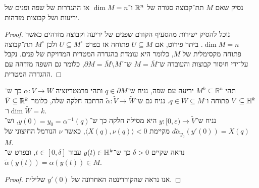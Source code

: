 \subquestion{}
נסיק שאם $M$ תת־קבוצה סגורה של $\mathbb{R}^n$ ו־$\dim M = n$ אז ההגדרות של שפה ופנים של יריעות ושל קבוצות מזדהות.
\begin{proof}
	נוכל להסיק ישירות מהסעיף הקודם שפנים של יריעה וקבוצה מזדהים כאשר $\dim M = n$.
	ביתר פירוט, אם $U \subseteq M$ פתוחה אז בפרט $U \subseteq M^\circ$ ולכן $M^\circ$ תת־קבוצה פתוחה מקסימלית של $M$, כלומר היא עומדת בהגדרה המטרית המדויקת של פנים.
	נקבל על־ידי חיסור קבוצות והעובדה ש־$M = \overline{M}$ ש־$\partial M = \overline{M} \setminus M^\circ$, כלומר גם השפה מזדהה עם ההגדרה המטרית.
\end{proof}

\question{}
תהי $M^k \subseteq \mathbb{R}^n$ יריעה עם שפה,
נניח ש־$q \in \partial M$ ותהי פרמטריזציה $\alpha : V \to W$ כך ש־$V \subseteq \mathbb{H}^k$ פתוחה ו־$q \in W \subseteq M$.
נניח גם ש־$\tilde{\alpha} : \tilde{V} \to \tilde{W}$ הרחבה חלקה שלה, כלומר $\tilde{V} \subseteq \mathbb{R}^k$ ו־$\dim \tilde{W} = k$. \\
נניח ש־$y : [0, \varepsilon) \to \tilde{V}$ היא מסילה חלקה כך ש־$y(0) = y_0 = \alpha^{-1}(q)$, וש־$d \tilde{\alpha}_{y_0}(y'(0)) = X(q)$ מקיימת $\langle X(q), \nu(q) \rangle < 0$,
כאשר $\nu$ הנורמל החיצוני של $M$. \\
נראה שקיים $\delta > 0$ כך ש־$y(t) \in \mathbb{H}^k$ עבור $t \in [0, \delta]$,
ובפרט ש־$\tilde{\alpha}(y(t)) = \alpha(y(t)) \in M$.
\begin{proof}
	אנו נראה שהקורדינטה האחרונה של $y'(0)$ שלילית.
\end{proof}


